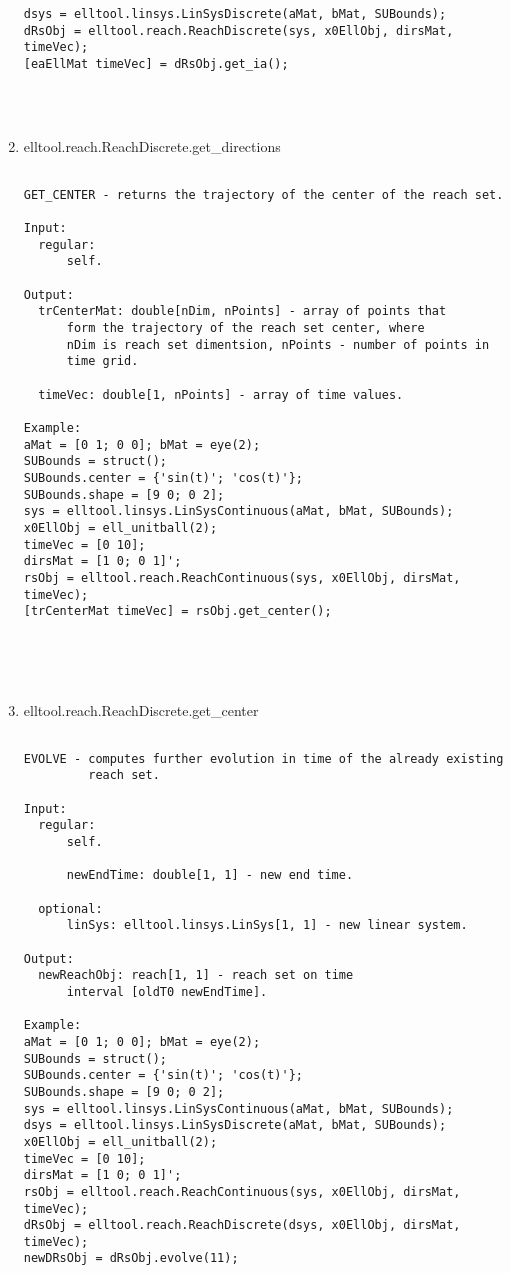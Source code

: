 \begin{enumerate}
\begin{lstlisting}
dsys = elltool.linsys.LinSysDiscrete(aMat, bMat, SUBounds);
dRsObj = elltool.reach.ReachDiscrete(sys, x0EllObj, dirsMat, timeVec);
[eaEllMat timeVec] = dRsObj.get_ia();




\end{lstlisting}
\fontfamily{\familydefault}
\selectfont
\item {elltool.reach.ReachDiscrete.get\_directions}
\selectfont
\begin{lstlisting}

GET_CENTER - returns the trajectory of the center of the reach set.

Input:
  regular:
      self.

Output:
  trCenterMat: double[nDim, nPoints] - array of points that
      form the trajectory of the reach set center, where
      nDim is reach set dimentsion, nPoints - number of points in
      time grid.

  timeVec: double[1, nPoints] - array of time values.

Example:
aMat = [0 1; 0 0]; bMat = eye(2);
SUBounds = struct();
SUBounds.center = {'sin(t)'; 'cos(t)'};
SUBounds.shape = [9 0; 0 2];
sys = elltool.linsys.LinSysContinuous(aMat, bMat, SUBounds);
x0EllObj = ell_unitball(2);
timeVec = [0 10];
dirsMat = [1 0; 0 1]';
rsObj = elltool.reach.ReachContinuous(sys, x0EllObj, dirsMat, timeVec);
[trCenterMat timeVec] = rsObj.get_center();





\end{lstlisting}
\fontfamily{\familydefault}
\selectfont
\item {elltool.reach.ReachDiscrete.get\_center}
\selectfont
\begin{lstlisting}

EVOLVE - computes further evolution in time of the already existing
         reach set.

Input:
  regular:
      self.

      newEndTime: double[1, 1] - new end time.

  optional:
      linSys: elltool.linsys.LinSys[1, 1] - new linear system.

Output:
  newReachObj: reach[1, 1] - reach set on time
      interval [oldT0 newEndTime].

Example:
aMat = [0 1; 0 0]; bMat = eye(2);
SUBounds = struct();
SUBounds.center = {'sin(t)'; 'cos(t)'};
SUBounds.shape = [9 0; 0 2];
sys = elltool.linsys.LinSysContinuous(aMat, bMat, SUBounds);
dsys = elltool.linsys.LinSysDiscrete(aMat, bMat, SUBounds);
x0EllObj = ell_unitball(2);
timeVec = [0 10];
dirsMat = [1 0; 0 1]';
rsObj = elltool.reach.ReachContinuous(sys, x0EllObj, dirsMat, timeVec);
dRsObj = elltool.reach.ReachDiscrete(dsys, x0EllObj, dirsMat, timeVec);
newDRsObj = dRsObj.evolve(11);






\end{lstlisting}
\end{enumerate}
